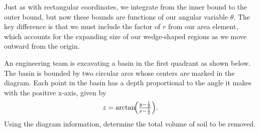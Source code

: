 \noindent Just as with rectangular coordinates, we integrate from the inner bound to the outer bound, but now these bounds are functions of our angular variable $\theta$. The key difference is that we must include the factor of $r$ from our area element, which accounts for the expanding size of our wedge-shaped regions as we move outward from the origin.

\exampleline
\begin{example}
An engineering team is excavating a basin in the first quadrant as shown below. The basin is bounded by two circular arcs whose centers are marked in the diagram. Each point in the basin has a depth proportional to the angle it makes with the positive x-axis, given by
\[
z = \arctan\!\Bigl(\tfrac{y - \frac{1}{2}}{x- \frac{1}{2}}\Bigr).
\]
Using the diagram information, determine the total volume of soil to be removed.

\begin{figure}[H]
\centering
{}
\end{figure}
\end{example}
